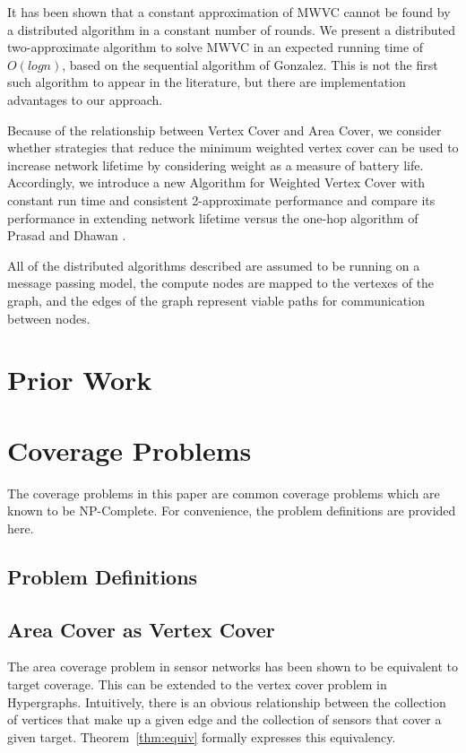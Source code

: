 It has been shown that a constant approximation of MWVC cannot be found by a distributed algorithm in a constant number of rounds.\cite{1011811} We present a distributed two-approximate algorithm to solve MWVC in an expected running time of $O(logn)$, based on the sequential algorithm of Gonzalez.\cite{Gonzalez1995129} This is not the first such algorithm to appear in the literature, but there are implementation advantages to our approach.

Because of the relationship between Vertex Cover and Area Cover, we consider whether strategies that reduce the minimum weighted vertex cover can be used to increase network lifetime by considering weight as a measure of battery life. Accordingly, we introduce a new Algorithm for Weighted Vertex Cover with constant run time and consistent 2-approximate performance and compare its performance in extending network lifetime versus the one-hop algorithm of Prasad and Dhawan \cite{Dhawan:hipc-09}. 

All of the distributed algorithms described are assumed to be running on a message passing model, the compute nodes are mapped to the vertexes of the graph, and the edges of the graph represent viable paths for communication between nodes. 

\section{Prior Work}

\section{Coverage Problems}
The coverage problems in this paper are common coverage problems which are known to be NP-Complete. For convenience, the problem definitions are provided here.
\subsection{Problem Definitions}



\subsection{Area Cover as Vertex Cover}
\label{sec:area-vertex}
The area coverage problem in sensor networks has been shown to be equivalent to target coverage.\cite{IPDPS.2008.45361} This can be extended to the vertex cover problem in Hypergraphs. Intuitively, there is an obvious relationship between the collection of vertices that make up a given edge and the collection of sensors that cover a given target.  Theorem~\ref{thm:equiv} formally expresses this equivalency.

